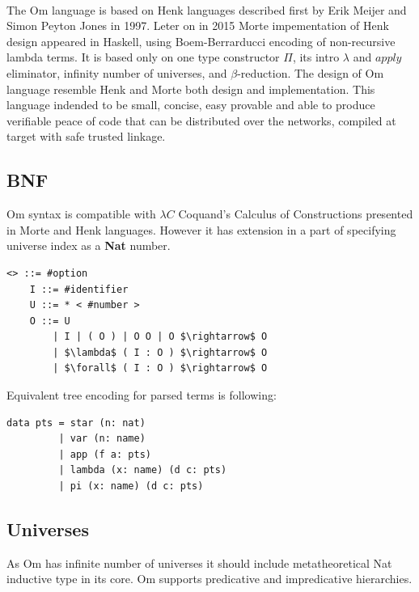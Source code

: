 \documentclass[11pt,oneside]{article}
\begin{document}
\paragraph{}
The Om language is based on Henk\cite{henk} languages described first
by Erik Meijer and Simon Peyton Jones in 1997. Leter on in 2015 Morte impementation
of Henk design appeared in Haskell, using Boem-Berrarducci encoding of non-recursive lambda terms.
It is based only on one type constructor $\Pi$, its intro $\lambda$ and $apply$ eliminator,
infinity number of universes, and $\beta$-reduction. The design of Om language resemble
Henk and Morte both design and implementation. This language indended to be small,
concise, easy provable and able to produce verifiable peace of code that can be
distributed over the networks, compiled at target with safe trusted linkage.

\newpage

\subsection{BNF}

Om syntax is compatible with $\lambda C$ Coquand's Calculus of Constructions presented
in Morte and Henk languages. However it has extension in a part of specifying
universe index as a {\bf Nat} number.

\vspace{0.5cm}
\begin{lstlisting}[mathescape=true]
   <> ::= #option
    I ::= #identifier
    U ::= * < #number >
    O ::= U
        | I | ( O ) | O O | O $\rightarrow$ O
        | $\lambda$ ( I : O ) $\rightarrow$ O
        | $\forall$ ( I : O ) $\rightarrow$ O
\end{lstlisting}

Equivalent tree encoding for parsed terms is following:
\vspace{0.5cm}
\begin{lstlisting}[mathescape=true]
data pts = star (n: nat)
         | var (n: name)
         | app (f a: pts)
         | lambda (x: name) (d c: pts)
         | pi (x: name) (d c: pts)
\end{lstlisting}

\subsection{Universes}

As Om has infinite number of universes it should include metatheoretical Nat
inductive type in its core. Om supports predicative and impredicative hierarchies.
\end{document}

